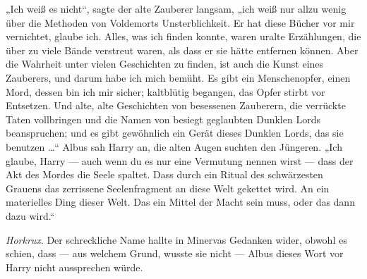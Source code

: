 „Ich weiß es nicht“, sagte der alte Zauberer langsam, „ich weiß nur allzu wenig über die Methoden von Voldemorts Unsterblichkeit. Er hat diese Bücher vor mir vernichtet, glaube ich. Alles, was ich finden konnte, waren uralte Erzählungen, die über zu viele Bände verstreut waren, als dass er sie hätte entfernen können. Aber die Wahrheit unter vielen Geschichten zu finden, ist auch die Kunst eines Zauberers, und darum habe ich mich bemüht. Es gibt ein Menschenopfer, einen Mord, dessen bin ich mir sicher; kaltblütig begangen, das Opfer stirbt vor Entsetzen. Und alte, alte Geschichten von besessenen Zauberern, die verrückte Taten vollbringen und die Namen von besiegt geglaubten Dunklen Lords beanspruchen; und es gibt gewöhnlich ein Gerät dieses Dunklen Lords, das sie benutzen …“ Albus sah Harry an, die alten Augen suchten den Jüngeren.
„Ich glaube, Harry — auch wenn du es nur eine Vermutung nennen wirst — dass der Akt des Mordes die Seele spaltet. Dass durch ein Ritual des schwärzesten Grauens das zerrissene Seelenfragment an diese Welt gekettet wird. An ein materielles Ding dieser Welt. Das ein Mittel der Macht sein muss, oder das dann dazu wird.“

\emph{Horkrux}. Der schreckliche Name hallte in Minervas Gedanken wider, obwohl es schien, dass — aus welchem Grund, wusste sie nicht — Albus dieses Wort vor Harry nicht aussprechen würde.


